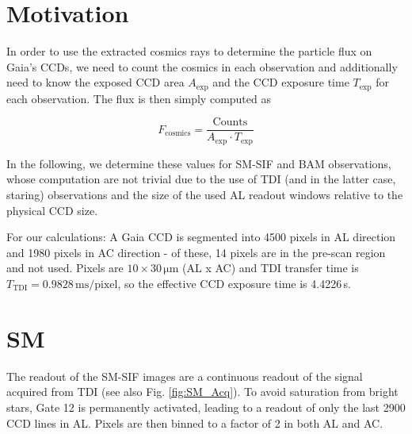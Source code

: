 \documentclass[12pt]{article}
\begin{document}
\section{Motivation}

In order to use the extracted cosmics rays to determine the particle flux on Gaia's CCDs, we need to count the cosmics in each observation and additionally need to know the exposed CCD area $A_\mathrm{exp}$ and the CCD exposure time $T_\mathrm{exp}$ for each observation. The flux is then simply computed as

\begin{equation}
  F_\mathrm{cosmics} = \frac{\mathrm{Counts}}{A_\mathrm{exp} \cdot T_\mathrm{exp}}
\end{equation}

In the following, we determine these values for SM-SIF and BAM observations, whose computation are not trivial due to the use of TDI (and in the latter case, staring) observations and the size of the used AL readout windows relative to the physical CCD size.

For our calculations: A Gaia CCD is segmented into 4500 pixels in AL direction and 1980 pixels in AC direction - of these, 14 pixels are in the pre-scan region and not used. Pixels are $10 \times 30\, \mathrm{\mu m}$ (AL x AC) and TDI transfer time is $T_\mathrm{TDI} = 0.9828\, \mathrm{ms/pixel}$, so the effective CCD exposure time is 4.4226\,s.

\section{SM}

The readout of the SM-SIF images are a continuous readout of the signal acquired from TDI (see also Fig. \ref{fig:SM_Acq}). To avoid saturation from bright stars, Gate 12 is permanently activated, leading to a readout of only the last 2900 CCD lines in AL. Pixels are then binned to a factor of 2 in both AL and AC.
\end{document}
